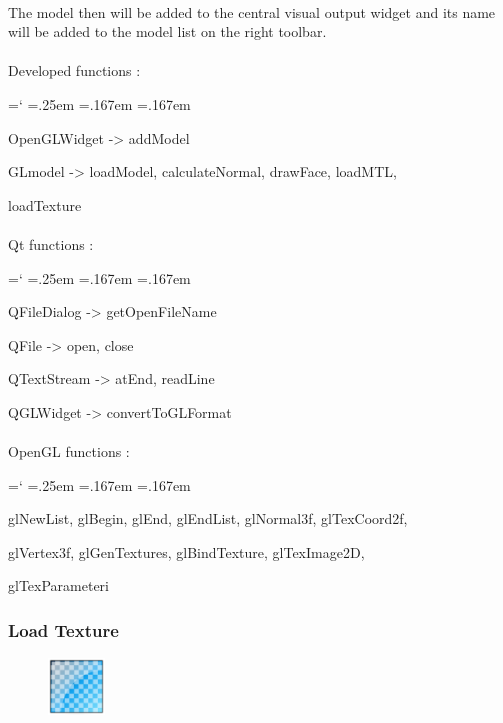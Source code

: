 \documentclass[12pt]{report}
\DeclareRobustCommand*{\ttfamily}{
  \origttfamily
  \hyphenchar\font=`\-\relax
  \fontdimen3\font=.25em\relax
  \fontdimen4\font=.167em\relax
  \fontdimen7\font=.167em\relax
}
\newenvironment{code}{\ttfamily}{}
\begin{document}
\paragraph{}
	The model then will be added to the central visual output widget and its name will be added to the model list on the right toolbar.


\paragraph{}
	Developed functions :

	\begin{code}
	OpenGLWidget -> addModel

	GLmodel -> loadModel, calculateNormal, drawFace, loadMTL,

	loadTexture
	\end{code}

\paragraph{}
	Qt functions :

	\begin{code}
	QFileDialog -> getOpenFileName

	QFile -> open, close

	QTextStream -> atEnd, readLine

	QGLWidget -> convertToGLFormat
	\end{code}

\paragraph{}
	OpenGL functions :

	\begin{code}
	glNewList, glBegin, glEnd, glEndList, glNormal3f, glTexCoord2f,

	glVertex3f, glGenTextures, glBindTexture, glTexImage2D,

	glTexParameteri
	\end{code}



\subsubsection{Load Texture}

\begin{figure}
\vspace{-20pt}
\includegraphics[width=1.5cm]{icons/texture.png}
\end{figure}
\end{document}
